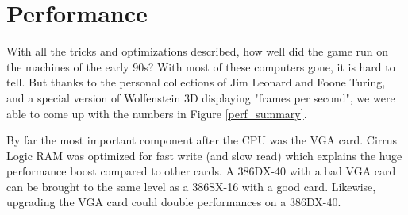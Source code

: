 \section{Performance}
With all the tricks and optimizations described, how well did the game run on the machines of the early 90s? With most of these computers gone, it is hard to tell. But thanks to the personal collections of Jim Leonard and Foone Turing, and a special version of Wolfenstein 3D displaying "frames per second", we were able to come up with the numbers in Figure \ref{perf_summary}.\\
\par
By far the most important component after the CPU was the VGA card. Cirrus Logic RAM was optimized for fast write (and slow read) which explains the huge performance boost compared to other cards. A 386DX-40 with a bad VGA card can be brought to the same level as a 386SX-16 with a good card. Likewise, upgrading the VGA card could double performances on a 386DX-40.\\ 
\par

